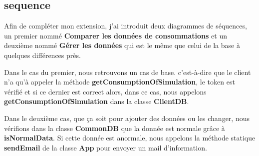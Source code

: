 \subsection{sequence}

\begin{flushleft}
Afin de compléter mon extension, j'ai introduit deux diagrammes de séquences, un premier nommé \textbf{Comparer les données de consommations} et un deuxième nommé \textbf{Gérer les données} qui est le même que celui de la base à quelques différences près.
\end{flushleft}

\begin{flushleft}
Dans le cas du premier, nous retrouvons un cas de base. c'est-à-dire que le client n'a qu'à appeler la méthode \textbf{getConsumptionOfSimulation}, le token est vérifié et si ce dernier est correct alors, dans ce cas, nous appelons \textbf{getConsumptionOfSimulation} dans la classe \textbf{ClientDB}.
\end{flushleft}



\begin{flushleft}
Dans le deuxième cas, que ça soit pour ajouter des données ou les changer, nous vérifions dans la classe \textbf{CommonDB} que la donnée est normale grâce à \textbf{isNormalData}. Si cette donnée est anormale, nous appelons la méthode statique \textbf{sendEmail} de la classe \textbf{App} pour envoyer un mail d'information.
\end{flushleft}


